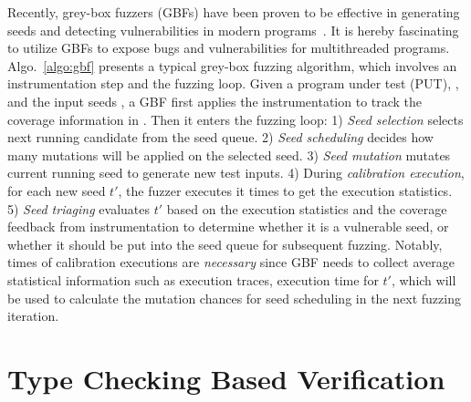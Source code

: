 Recently, grey-box fuzzers (GBFs) have been proven to be effective in generating seeds and detecting vulnerabilities in modern programs~\cite{fuzz_survey,afl,libfuzzer,Angora}. It is hereby fascinating to utilize GBFs to expose bugs and vulnerabilities for multithreaded programs.
Algo.~\ref{algo:gbf} presents a typical grey-box fuzzing algorithm, which involves an instrumentation step and the fuzzing loop.
Given a program under test (PUT), \ProgO, and the input seeds \Seeds, a GBF first applies the instrumentation to track the coverage information in \ProgO. Then it enters the fuzzing loop:
1) \emph{Seed selection} selects next running candidate from the seed queue. 2) \emph{Seed scheduling} decides how many mutations will be applied on the selected seed. 3) \emph{Seed mutation} mutates current running seed to generate new test inputs. 4) During \emph{calibration execution}, for each new seed $t'$, the fuzzer executes it \Ncal times to get the execution statistics. 5) \emph{Seed triaging} evaluates $t'$  based on the execution statistics and the coverage feedback from instrumentation to determine whether it is a vulnerable seed, or whether it should be put into the seed queue for subsequent fuzzing. Notably, \Ncal times of calibration executions are \emph{necessary} since GBF needs to collect average statistical 
information such as execution traces, execution time for $t'$, which will be used to 
calculate the mutation chances for seed scheduling in the next fuzzing iteration.

\section{Type Checking Based Verification}


